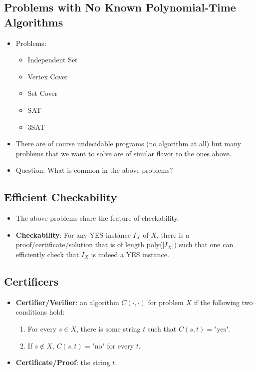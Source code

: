 \documentclass[12pt]{article}
\begin{document}
\subsection{Problems with No Known Polynomial-Time Algorithms}
\begin{itemize}
    \item Problems:
    \begin{itemize}
        \item Independent Set
        \item Vertex Cover
        \item Set Cover
        \item SAT
        \item 3SAT
    \end{itemize}
    \item There are of course undecidable programs (no algorithm at all) but many problems that we want to solve are of similar flavor to the ones above.
    \item Question: What is common in the above problems?
\end{itemize}

\subsection{Efficient Checkability}
\begin{itemize}
    \item The above problems share the feature of checkability.
    \item \textbf{Checkability}: For any YES instance $I_X$ of $X$, there is a proof/certificate/solution that is of length poly($\left| I_X \right|)$ such that one can efficiently check that $I_X$ is indeed a YES instance.
\end{itemize}

\subsection{Certificers}
\begin{itemize}
    \item \textbf{Certifier/Verifier}: an algorithm $C(\cdot, \cdot)$ for problem $X$ if the following two conditions hold:
    \begin{enumerate}
        \item For every $s \in  X$, there is some string $t$ such that $C(s, t) = \text{"yes"}$.
        \item If $s \notin X$, $C(s, t) = \text{"no"}$ for every $t$.
    \end{enumerate}
    \item \textbf{Certificate/Proof}: the string $t$.
\end{itemize}
\end{document}
